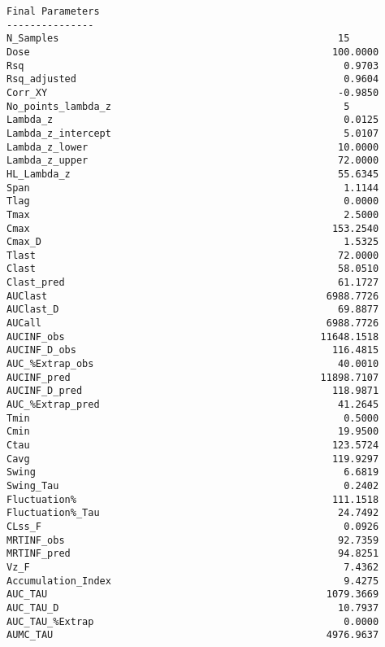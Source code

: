\documentclass[12pt,a4paper]{article}
\begin{document}
\begin{verbatim}
Final Parameters
---------------
N_Samples                                                15
Dose                                                    100.0000
Rsq                                                       0.9703
Rsq_adjusted                                              0.9604
Corr_XY                                                  -0.9850
No_points_lambda_z                                        5
Lambda_z                                                  0.0125
Lambda_z_intercept                                        5.0107
Lambda_z_lower                                           10.0000
Lambda_z_upper                                           72.0000
HL_Lambda_z                                              55.6345
Span                                                      1.1144
Tlag                                                      0.0000
Tmax                                                      2.5000
Cmax                                                    153.2540
Cmax_D                                                    1.5325
Tlast                                                    72.0000
Clast                                                    58.0510
Clast_pred                                               61.1727
AUClast                                                6988.7726
AUClast_D                                                69.8877
AUCall                                                 6988.7726
AUCINF_obs                                            11648.1518
AUCINF_D_obs                                            116.4815
AUC_%Extrap_obs                                          40.0010
AUCINF_pred                                           11898.7107
AUCINF_D_pred                                           118.9871
AUC_%Extrap_pred                                         41.2645
Tmin                                                      0.5000
Cmin                                                     19.9500
Ctau                                                    123.5724
Cavg                                                    119.9297
Swing                                                     6.6819
Swing_Tau                                                 0.2402
Fluctuation%                                            111.1518
Fluctuation%_Tau                                         24.7492
CLss_F                                                    0.0926
MRTINF_obs                                               92.7359
MRTINF_pred                                              94.8251
Vz_F                                                      7.4362
Accumulation_Index                                        9.4275
AUC_TAU                                                1079.3669
AUC_TAU_D                                                10.7937
AUC_TAU_%Extrap                                           0.0000
AUMC_TAU                                               4976.9637




\end{verbatim}
\end{document}
